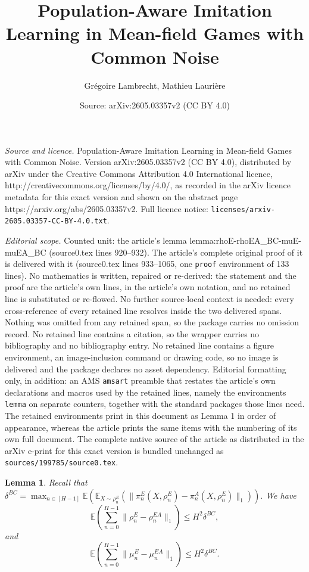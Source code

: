 \documentclass[10pt,a4paper]{amsart}
\title{Population-Aware Imitation Learning in Mean-field Games with Common Noise}
\author{Gr\'egoire Lambrecht, Mathieu Lauri\`ere}
\date{Source: arXiv:2605.03357v2 (CC BY 4.0)}
\newtheorem{lemma}{Lemma}
\newcommand\EE{ {\mathbb E} }
\begin{document}
\maketitle

\noindent\emph{Source and licence.} Population-Aware Imitation Learning in Mean-field Games with Common Noise. Version arXiv:2605.03357v2 (CC BY 4.0), distributed by arXiv under the Creative Commons Attribution 4.0 International licence, http://creativecommons.org/licenses/by/4.0/, as recorded in the arXiv licence metadata for this exact version and shown on the abstract page https://arxiv.org/abs/2605.03357v2. Full licence notice: \texttt{licenses/arxiv-2605.03357-CC-BY-4.0.txt}.\par\smallskip

\noindent\textit{Editorial scope.} Counted unit: the article's lemma lemma:rhoE-rhoEA\_BC-muE-muEA\_BC (source0.tex lines 920--932). The article's complete original proof of it is delivered with it (source0.tex lines 933--1065, one \texttt{proof} environment of 133 lines). No mathematics is written, repaired or re-derived: the statement and the proof are the article's own lines, in the article's own notation, and no retained line is substituted or re-flowed.  No further source-local context is needed: every cross-reference of every retained line resolves inside the two delivered spans.  Nothing was omitted from any retained span, so the package carries no omission record.  No retained line contains a citation, so the wrapper carries no bibliography and no bibliography entry.  No retained line contains a figure environment, an image-inclusion command or drawing code, so no image is delivered and the package declares no asset dependency.  Editorial formatting only, in addition: an AMS \texttt{amsart} preamble that restates the article's own declarations and macros used by the retained lines, namely the environments \texttt{lemma} on separate counters, together with the standard packages those lines need.  The retained environments print in this document as Lemma 1 in order of appearance, whereas the article prints the same items with the numbering of its own full document.  The complete native source of the article as distributed in the arXiv e-print for this exact version is bundled unchanged as \texttt{sources/199785/source0.tex}.
\begin{lemma}
    \label{lemma:rhoE-rhoEA_BC-muE-muEA_BC}
    Recall that $\delta^{BC} = \max_{n \in [H-1]} \EE(\EE_{X \sim \rho^E_n}( \| \pi^E_n(X, \rho^E_n) - \pi^A_n(X, \rho^E_n) \|_1)).$ We have 
    \begin{equation}
        \label{eq:rhoE-rhoEA_BC}
        \EE(\sum_{n=0}^{H-1} \| \rho^{E}_n - \rho^{EA}_n \|_1) \leq H^2 \delta^{BC},
    \end{equation}
    and
    \begin{equation}
        \label{eq:muE-muEA_BC}
        \EE(\sum_{n=0}^{H-1} \| \mu^{E}_n - \mu^{EA}_n \|_1) \leq H^2 \delta^{BC}.
    \end{equation}
\end{lemma}
\end{document}
